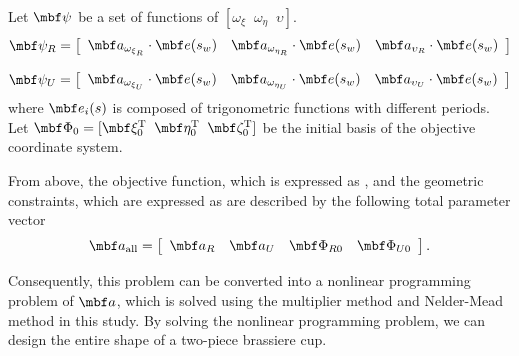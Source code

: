 \documentclass[E]{scitrans}
\begin{document}
 Let $ \mbold{\psi}$ be a set of functions of $[\omega_{\xi} \;\; \omega_{\eta} \;\; \upsilon] $. 
\begin{equation}\label{eq:R_eq}
\mbold{\psi}_R = \left[ \begin{array}{ccc} \mbold{a}_{\omega_{\xi_R}} \cdot \mbold{e}(s_w) & \mbold{a}_{\omega_{\eta_R}} \cdot \mbold{e}(s_w)& \mbold{a}_{\upsilon_R} \cdot \mbold{e}(s_w) \end{array} \right]
\end{equation}

\begin{equation}\label{eq:U_eq}
\mbold{\psi}_U = \left[ \begin{array}{ccc} \mbold{a}_{\omega_{\xi_U}} \cdot  \mbold{e}(s_w) & \mbold{a}_{\omega_{\eta_U}} \cdot  \mbold{e}(s_w) & \mbold{a}_{\upsilon_U} \cdot  \mbold{e}(s_w)  \end{array} \right]
\end{equation}
where $ \mbold{e}_i(s) $ is composed of trigonometric functions with different periods. Let $ \mbold{\Phi}_0 = [\xivec_0^\mathrm{T} \;\; \etavec_0^\mathrm{T} \;\; \zetavec_0^\mathrm{T}] $ be the initial basis of the objective coordinate system.

From above, the objective function, which is expressed as , and the geometric constraints, which are expressed as   are described by the following total parameter vector 
\begin{equation}\label{eq:TotalCoefs}
\mbold{a}_{\mathrm{all}} = \left[ \begin{array}{cccc}
\mbold{a}_R & \mbold{a}_U & \mbold{\Phi}_{R0} &\mbold{\Phi}_{U0} 
\end{array}\right].
\end{equation}

Consequently, this problem can be converted into a nonlinear programming problem of $ \mbold{a} $, which is solved using the multiplier method and Nelder-Mead method in this study. By solving the nonlinear programming problem, we can design the entire shape of a two-piece brassiere cup. 
\end{document}
